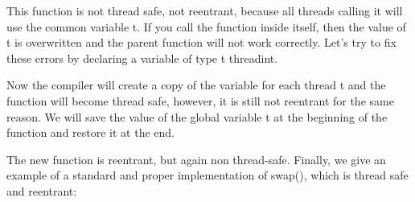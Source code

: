 {	\begin{figure}[H]
		
	\end{figure}
	\par This function is not thread safe, not reentrant, because all threads calling it will use the common variable t. If you call the function inside itself, then the value of t is overwritten and the parent function will not work correctly. Let's try to fix these errors by declaring a variable of type t \textunderscore \textunderscore threadint.
	\begin{figure}[H]
		
	\end{figure}
	\par Now the compiler will create a copy of the variable for each thread t and the function will become thread safe, however, it is still not reentrant for the same reason. We will save the value of the global variable t at the beginning of the function and restore it at the end.
	\begin{figure}[H]
		
	\end{figure}
	\par The new function is reentrant, but again non thread-safe. Finally, we give an example of a standard and proper implementation of swap(), which is thread safe and reentrant:
	\begin{figure}[H]
		
	\end{figure}
}